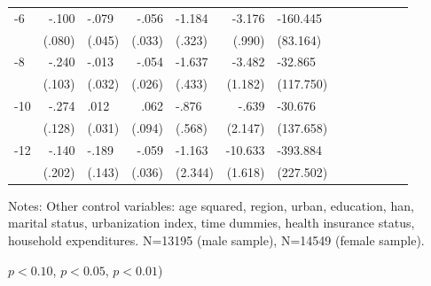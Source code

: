 \begin{table}[hp]
\begin{adjustbox}{max width=\linewidth}
\begin{threeparttable}
{\begin{tabular}{l*{6}{D{.}{.}{-1}l}}
-6             &    -.100         &    -.079\sym{*}  &    -.056\sym{*}  &   -1.184\sym{***}&   -3.176\sym{***}& -160.445\sym{*}  \\
                &   (.080)         &   (.045)         &   (.033)         &   (.323)         &   (.990)         & (83.164)         \\
-8             &    -.240\sym{**} &    -.013         &    -.054\sym{**} &   -1.637\sym{***}&   -3.482\sym{***}&  -32.865         \\
                &   (.103)         &   (.032)         &   (.026)         &   (.433)         &  (1.182)         &(117.750)         \\
-10            &    -.274\sym{**} &     .012         &     .062         &    -.876         &    -.639         &  -30.676         \\
                &   (.128)         &   (.031)         &   (.094)         &   (.568)         &  (2.147)         &(137.658)         \\
-12           &    -.140         &    -.189         &    -.059         &   -1.163         &  -10.633\sym{***}& -393.884\sym{*}  \\
                &   (.202)         &   (.143)         &   (.036)         &  (2.344)         &  (1.618)         &(227.502)         \\     
\bottomrule
\end{tabular}
\begin{tablenotes}
\item Notes: Other control variables: age squared, region, urban, education, han, marital status, urbanization index, time dummies, health insurance status, household expenditures. N=13195 (male sample), N=14549 (female sample).
\item \sym{*} \(p<0.10\), \sym{**} \(p<0.05\), \sym{***} \(p<0.01\))
\end{tablenotes}
}
\end{threeparttable}
\end{adjustbox}
\end{table}



